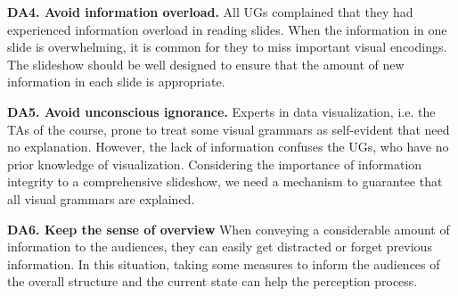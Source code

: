\noindent
\textbf{DA4. Avoid information overload.} 
All UGs complained that they had experienced information overload in reading slides. 
When the information in one slide is overwhelming, it is common for they to miss important visual encodings. 
The slideshow should be well designed to ensure that the amount of new information in each slide is appropriate. 

\noindent
\textbf{DA5. Avoid unconscious ignorance.}
Experts in data visualization, i.e. the TAs of the course, prone to treat some visual grammars as self-evident that need no  explanation. However, the lack of information confuses the UGs, who have no prior knowledge of visualization. 
Considering the importance of information integrity to a comprehensive slideshow, we need a mechanism to guarantee that all visual grammars are explained. 

\noindent
\textbf{DA6. Keep the sense of overview}
When conveying a considerable amount of information to the audiences, they can easily get distracted or forget previous information. In this situation, taking some measures to inform the audiences of the overall structure and the current state can help the perception process. 
